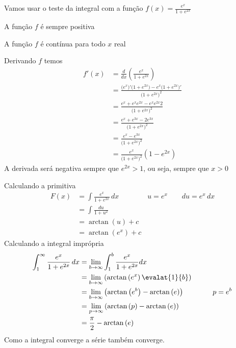 \documentclass[a4paper,12pt,fleqn]{article}
\begin{document}
\begin{answer}
  Vamos usar o teste da integral com a função \(f(x) = \frac{e^x}{1+e^{2x}}\)

  A função $f$ é sempre positiva

  A função $f$ é contínua para todo $x$ real

  Derivando $f$ temos
  \begin{align*}
    f'(x)
    & = \frac{d}{dx} \left(\frac{e^x}{1+e^{2x}}\right) \\
    & = \frac{\big(e^x\big)'\big(1+e^{2x}\big) - e^x\big(1+e^{2x}\big)'}{\big(1+e^{2x}\big)^2} \\
    & = \frac{e^x+e^xe^{2x} - e^xe^{2x}2}{\big(1+e^{2x}\big)^2} \\
    & = \frac{e^x +e^{3x} - 2e^{3x}}{\big(1+e^{2x}\big)^2} \\
    & = \frac{e^x - e^{3x}}{\big(1+e^{2x}\big)^2} \\
    & = \frac{e^x}{\big(1+e^{2x}\big)^2}\left(1 - e^{2x}\right)
  \end{align*}
  A derivada será negativa sempre que \(e^{2x}>1\), ou seja, sempre que \(x>0\)

  Calculando a primitiva
  \begin{align*}
    F(x)
    & = \int \frac{e^x}{1+e^{2x}} \, dx \qquad\qquad u = e^x \qquad du = e^x\,dx \\
    & = \int \frac{du}{1+u^2} \\
    & = \arctan\left(u\right) + c \\
    & = \arctan\left(e^x\right) + c
  \end{align*}
  Calculando a integral imprópria
  \begin{align*}
    \int_1^\infty \frac{e^x}{1+e^{2x}} \,dx
    & = \lim_{b\to\infty} \int_1^b \frac{e^x}{1+e^{2x}} dx \\
    & = \lim_{b\to\infty} \left(\arctan\left(e^x\right) \evalat{1}{b}\right) \\
    & = \lim_{b\to\infty} \left(\arctan\left(e^b\right) - \arctan\left(e\right)\right)
    \qquad\qquad p = e^b \\
    & = \lim_{p\to\infty} \left(\arctan\left(p\right) - \arctan\left(e\right)\right) \\
    & = \frac{\pi}{2} - \arctan\left(e\right)
  \end{align*}
  Como a integral converge a série também converge.
\end{answer}
\end{document}
